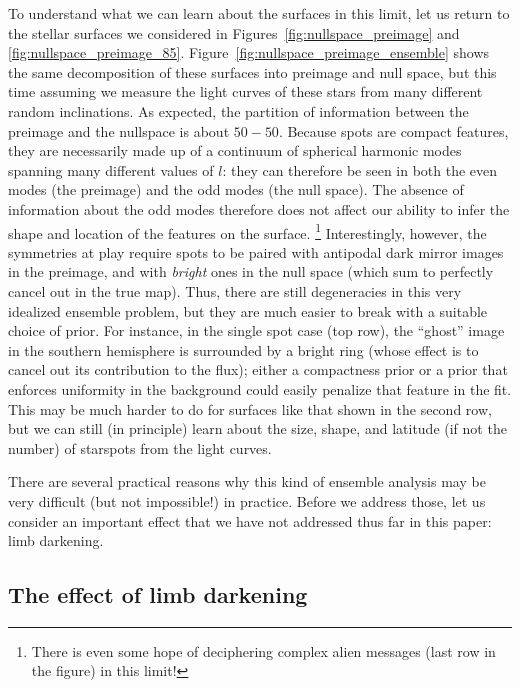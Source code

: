 \documentclass[modern]{aastex62}
\begin{document}
To understand what we can learn about the surfaces in this limit, let us
return to the stellar surfaces we considered in Figures~\ref{fig:nullspace_preimage}
and \ref{fig:nullspace_preimage_85}.
Figure~\ref{fig:nullspace_preimage_ensemble} shows the same decomposition of
these surfaces into preimage and null space, but this time assuming we measure
the light curves of these stars from many different random inclinations.
As expected, the partition of information between the preimage and the nullspace
is about $50{-}50$.
Because spots are compact features, they
are necessarily made up of a continuum of spherical harmonic modes spanning
many different values of $l$: they can therefore be seen in both the even
modes (the preimage) and the odd modes (the null space). The absence of
information about the odd modes therefore does not affect our ability to
infer the shape and location of the features on the surface.%
\footnote{
    There is even some hope of deciphering complex alien messages
    (last row in the figure) in this limit!
}
Interestingly, however,
the symmetries at play require spots to be paired with antipodal dark mirror
images in the preimage, and with \emph{bright} ones in the null space
(which sum to perfectly cancel out in the true map). Thus, there are still
degeneracies in this very idealized ensemble problem, but they are much easier to break
with a suitable choice of prior. For instance, in the single spot case
(top row), the ``ghost'' image in the southern hemisphere is surrounded by
a bright ring (whose effect is to cancel out its contribution to the flux);
either a compactness prior or a prior that enforces uniformity in the
background could easily penalize that feature in the fit. This may be
much harder to do for surfaces like that shown in the second row, but
we can still (in principle) learn about the size, shape, and latitude
(if not the number) of starspots from the light curves.

There are several practical reasons why this kind of ensemble analysis
may be very difficult (but not impossible!) in practice. Before
we address those, let us consider an important effect that we have not
addressed thus far in this paper: limb darkening.

\subsection{The effect of limb darkening}
\label{sec:limbdark}
\end{document}
